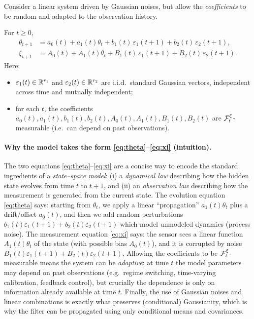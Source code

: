 Consider a linear system driven by Gaussian noises, but allow the \emph{coefficients}
to be random and adapted to the observation history.

For \(t\ge 0\),
\begin{align}
\theta_{t+1} &= a_0(t) + a_1(t)\theta_t + b_1(t)\,\varepsilon_1(t+1)+b_2(t)\,\varepsilon_2(t+1), \label{eq:theta}\\
\xi_{t+1} &= A_0(t) + A_1(t)\theta_t + B_1(t)\,\varepsilon_1(t+1)+B_2(t)\,\varepsilon_2(t+1). \label{eq:xi}
\end{align}
Here:
\begin{itemize}
  \item \(\varepsilon_1(t)\in\mathbb{R}^{r_1}\) and \(\varepsilon_2(t)\in\mathbb{R}^{r_2}\) are i.i.d.\ standard Gaussian vectors,
        independent across time and mutually independent;
  \item for each \(t\), the coefficients \(a_0(t),a_1(t),b_1(t),b_2(t),A_0(t),A_1(t),B_1(t),B_2(t)\)
        are \(\mathcal{F}_t^\xi\)-measurable (i.e.\ can depend on past observations).
\end{itemize}

\paragraph{Why the model takes the form \eqref{eq:theta}--\eqref{eq:xi} (intuition).}
The two equations \eqref{eq:theta}--\eqref{eq:xi} are a concise way to encode the standard ingredients of a
\emph{state--space model}: (i) a \emph{dynamical law} describing how the hidden state evolves from time \(t\) to \(t+1\),
and (ii) an \emph{observation law} describing how the measurement is generated from the current state.
The evolution equation \eqref{eq:theta} says: starting from \(\theta_t\), we apply a linear ``propagation''
\(a_1(t)\theta_t\) plus a drift/offset \(a_0(t)\), and then we add random perturbations
\(b_1(t)\varepsilon_1(t+1)+b_2(t)\varepsilon_2(t+1)\) which model unmodeled dynamics (process noise).
The measurement equation \eqref{eq:xi} says: the sensor sees a linear function \(A_1(t)\theta_t\) of the state
(with possible bias \(A_0(t)\)), and it is corrupted by noise
\(B_1(t)\varepsilon_1(t+1)+B_2(t)\varepsilon_2(t+1)\).
Allowing the coefficients to be \(\mathcal{F}_t^\xi\)-measurable means the system can be \emph{adaptive}:
at time \(t\) the model parameters may depend on past observations (e.g.\ regime switching, time-varying calibration,
feedback control), but crucially the dependence is only on information already available at time \(t\).
Finally, the use of Gaussian noises and linear combinations is exactly what preserves (conditional) Gaussianity,
which is why the filter can be propagated using only conditional means and covariances.

